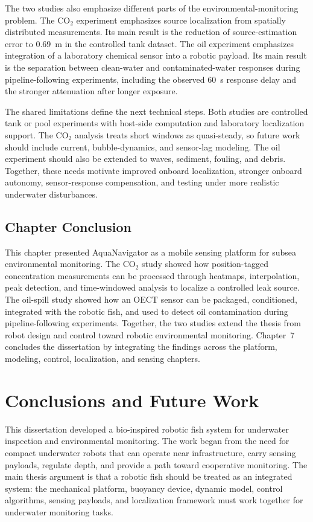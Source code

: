 \documentclass{uhcoethesis}
\begin{document}
The two studies also emphasize different parts of the environmental-monitoring problem. The \mbox{CO$_2$} experiment emphasizes source localization from spatially distributed measurements. Its main result is the reduction of source-estimation error to 0.69~m in the controlled tank dataset. The oil experiment emphasizes integration of a laboratory chemical sensor into a robotic payload. Its main result is the separation between clean-water and contaminated-water responses during pipeline-following experiments, including the observed 60~s response delay and the stronger attenuation after longer exposure.

The shared limitations define the next technical steps. Both studies are controlled tank or pool experiments with host-side computation and laboratory localization support. The \mbox{CO$_2$} analysis treats short windows as quasi-steady, so future work should include current, bubble-dynamics, and sensor-lag modeling. The oil experiment should also be extended to waves, sediment, fouling, and debris. Together, these needs motivate improved onboard localization, stronger onboard autonomy, sensor-response compensation, and testing under more realistic underwater disturbances.

\section{Chapter Conclusion}

This chapter presented AquaNavigator as a mobile sensing platform for subsea environmental monitoring. The \mbox{CO$_2$} study showed how position-tagged concentration measurements can be processed through heatmaps, interpolation, peak detection, and time-windowed analysis to localize a controlled leak source. The oil-spill study showed how an OECT sensor can be packaged, conditioned, integrated with the robotic fish, and used to detect oil contamination during pipeline-following experiments. Together, the two studies extend the thesis from robot design and control toward robotic environmental monitoring. Chapter~7 concludes the dissertation by integrating the findings across the platform, modeling, control, localization, and sensing chapters.
\chapter{Conclusions and Future Work}

This dissertation developed a bio-inspired robotic fish system for underwater inspection and environmental monitoring. The work began from the need for compact underwater robots that can operate near infrastructure, carry sensing payloads, regulate depth, and provide a path toward cooperative monitoring. The main thesis argument is that a robotic fish should be treated as an integrated system: the mechanical platform, buoyancy device, dynamic model, control algorithms, sensing payloads, and localization framework must work together for underwater monitoring tasks.
\end{document}
